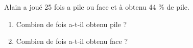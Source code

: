 \documentclass[exercice]{thedocument}%
\begin{document}
%
Alain a joué 25 fois a pile ou face et à obtenu 44 \% de pile.
\begin{enumerate}
    \item Combien de fois a-t-il obtenu pile ?
    \item Combien de fois a-t-il obtenu face ?
\end{enumerate}
\end{document}
